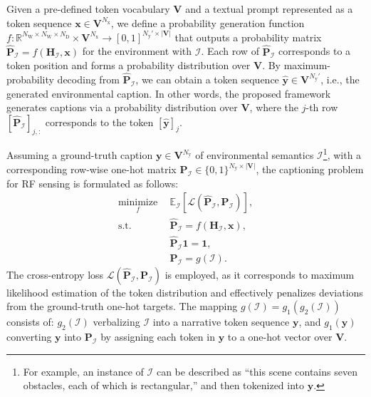 \documentclass[journal,10pt,twocolumn]{IEEEtran}
\newcommand\IC{\ensuremath{\mathcal{I}}}
\newcommand\LC{\ensuremath{\mathcal{L}}}
\newcommand\PB{\ensuremath{\bm{P}}}
\newcommand\xB{\ensuremath{\bm{x}}}
\newcommand\yB{\ensuremath{\bm{y}}}
\newcommand\HF{\ensuremath{\mathbf{H}}}
\newcommand\VF{\ensuremath{\mathbf{V}}}
\newcommand\oneF{\ensuremath{{\mathbf 1}}}
\newcommand\DR{\ensuremath{\mathrm{D}}}
\newcommand\WR{\ensuremath{\mathrm{W}}}
\newcommand\xR{\ensuremath{\mathrm{x}}}
\newcommand\yR{\ensuremath{\mathrm{y}}}
\newcommand\Rb{\ensuremath{\mathbb{R}}}
\newcommand{\wh}{\widehat}
\begin{document}
Given a pre-defined token vocabulary $\VF$ and a textual prompt represented as a token sequence $\xB\in\VF^{N_{\xR}}$, we define a probability generation function $f\!:\! \Rb^{N_{\WR}\times N_{\WR}\times N_{\DR}} \!\times\! \VF^{N_{\xR}}\!\!\to\!\! [0,1]^{N_{\yR}'\times|\VF|}$ that outputs a probability matrix $\wh{\PB}_{\IC}=f(\HF_{\IC},\xB)$ for the environment with $\IC$. Each row of $\wh{\PB}_{\IC}$ corresponds to a token position and forms a probability distribution over $\VF$.  By maximum-probability decoding from $\wh{\PB}_{\IC}$, we can obtain a token sequence $\wh{\yB}\in\VF^{N_{\yR}'}$, i.e., the generated environmental caption. In other words, the proposed framework generates captions via a probability distribution over $\VF$, where the $j$-th row $[\wh{\PB}_{\IC}]_{j,:}$ corresponds to the token $[\wh{\yB}]_{j}$. 


Assuming a ground-truth caption $\yB\in\VF^{N_{\yR}}$ of environmental semantics $\IC$\footnote{For example, an instance of $\IC$ can be described as “this scene contains seven obstacles, each of which is rectangular,” and then tokenized into $\yB$.}, with a corresponding row-wise one-hot matrix $\PB_{\IC}\in\{0,1\}^{N_{\yR}\times|\VF|}$, the captioning problem for RF sensing is formulated as follows:
\begin{subequations}\label{construction}
\begin{align}
	\underset{f}{\mathrm{minimize}}~~&\mathbb{E}_{\IC}\!\left[\LC\left(\wh{\PB}_{\IC},\PB_{\IC}\right)\right], \label{const:2a} \\
	\text{s.t.}~~& \wh{\PB}_{\IC}=f(\HF_{\IC},\xB), \label{const:2d}\\
	& \wh{\PB}_{\IC}\oneF=\oneF, \label{const:2f}\\
	& \PB_{\IC}=g(\IC). \label{const:2b}
\end{align}
\end{subequations} The cross-entropy loss $\LC(\wh{\PB}_{\IC},\PB_{\IC})$ is employed, as it corresponds to maximum likelihood estimation of the token distribution and effectively penalizes deviations from the ground-truth one-hot targets. The mapping $g(\IC)=g_1(g_2(\IC))$ consists of: $g_2(\IC)$ verbalizing $\IC$ into a narrative token sequence $\yB$, and $g_1(\yB)$ converting $\yB$ into $\PB_{\IC}$ by assigning each token in $\yB$ to a one-hot vector over $\VF$.
\end{document}
